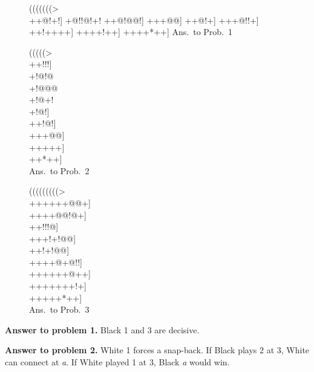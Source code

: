 \documentclass[mcrownvopaper,10pt,twopage,onecolumn,final]{memoir}
\begin{document}
\begin{figure}[ht]
    \begin{minipage}[c]{0.32\linewidth}
        \centering    
        {\gnos%
        (((((((>\\
        ++{\gnosb{}}@!+!]
        +@!!@!+!
        ++@!@@!]
        ++{\gnosb{}}{\gnosw{}}+@@]
        ++{\gnosb{}}{\gnosw{}}@!+]
        +++@!!+]
        ++!++++]
        ++++!++]
        ++++*++]
        }
        Ans.\ to Prob.\ 1
    \end{minipage}%
    \begin{minipage}[c]{0.27\linewidth}
        \centering    
        {\gnos%
        (((((>\\
        ++!!!]\\
        +!@!@{\gnosw{}}\\
        +!@@@{\gnosw{}}\\
        +!@+!\\
        +!@!{\gnosb{}}]\\
        ++!@!]\\
        +++@@]\\
        +++++]\\
        ++*++]\\
        }
        Ans.\ to Prob.\ 2
    \end{minipage}%
    \begin{minipage}[c]{0.41\linewidth}
        \centering    
        {\gnos%
        (((((((((>\\
        ++++++@@+]\\
        ++++@@!@+]\\
        ++{\gnosb{}}{\gnosw{}}!!!@]\\
        +++!{\gnosb{}}+!@@]\\
        ++!+{\gnosw{}}{\gnosb{}}!@@]\\
        ++++@+@!!]\\
        ++++++@++]\\
        +++++++!+]\\
        +++++*++]\\
        }
        Ans.\ to Prob.\ 3
    \end{minipage}
\end{figure}

\noindent
\textbf{Answer to problem 1.} Black 1 and 3 are decisive.

\noindent
\textbf{Answer to problem 2.} White 1 forces a snap-back. If Black plays 2 at
3, White can connect at \textit{a}.
If White played 1 at 3, Black \textit{a} would win.
\end{document}
